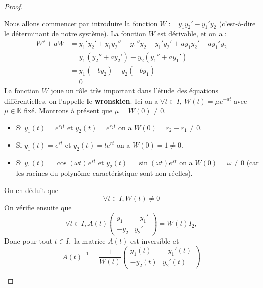 \documentclass[french]{book}
\theoremstyle{plain}
\theoremstyle{definition}
\theoremstyle{remark}
\begin{document}
\begin{proof}
\begin{itemize}
	Nous allons commencer par introduire la fonction $W:=y_1y_2'-y_1'y_2$ (c'est-à-dire le déterminant de notre système). La fonction $W$ est dérivable, et on a :
	\begin{align*}
		W'+aW&=y_1'y_2'+y_1y_2''-y_1''y_2-y_1'y_2'+ay_1y_2'-ay_1'y_2\\
		&=y_1(y_2''+ay_2')-y_2(y_1''+ay_1')\\
		&=y_1(-by_2)-y_2(-by_1)\\
		&=0
	\end{align*}
	La fonction $W$ joue un rôle très important dans l'étude des équations différentielles, on l'appelle le \textbf{wronskien}. Ici on a $\forall t \in I,\ W(t) = \mu e^{-at}$ avec $\mu \in \mathbb{K}$ fixé. Montrons à
	présent que $\mu = W(0) \neq 0$.
	\begin{itemize}
		\item[--]Si $y_1(t) = e^{r_1 t}$ et $y_2(t) = e^{r_2 t}$ on a $W(0) = r_2 - r_1 \neq 0$.
		\item[--]Si $y_1(t) = e^{rt}$ et $y_2(t) = te^{rt}$ on a $W(0) = 1 \neq 0$.
		\item[--]Si $y_1(t) = \cos(\omega t)e^{st}$ et $y_2(t) = \sin(\omega t)e^{st}$ on a $W(0) = \omega \neq 0$ (car les racines du polynôme caractéristique sont non réelles).
	\end{itemize}
	On en déduit que $$\forall t \in I, W(t) \neq 0$$ On vérifie ensuite que $$\forall t \in I, A(t) \begin{pmatrix} y_1 & -y_1' \\ -y_2 & y_2' \end{pmatrix} = W(t)I_2,$$
	Donc pour tout $t \in I,$ la matrice $A(t)$ est inversible et $$A(t)^{-1} = \frac{1}{W(t)} \begin{pmatrix} y_1(t) & -y_1'(t) \\ -y_2(t) & y_2'(t) \end{pmatrix}$$
	

\end{itemize}
\end{proof}
\end{document}
